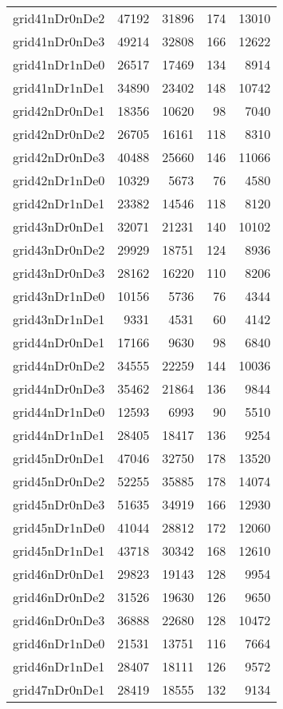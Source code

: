\begin{longtable}{lrrrr}
grid41nDr0nDe2 & 47192 & 31896 & 174 & 13010 \\
grid41nDr0nDe3 & 49214 & 32808 & 166 & 12622 \\
grid41nDr1nDe0 & 26517 & 17469 & 134 & 8914 \\
grid41nDr1nDe1 & 34890 & 23402 & 148 & 10742 \\
grid42nDr0nDe1 & 18356 & 10620 & 98 & 7040 \\
grid42nDr0nDe2 & 26705 & 16161 & 118 & 8310 \\
grid42nDr0nDe3 & 40488 & 25660 & 146 & 11066 \\
grid42nDr1nDe0 & 10329 & 5673 & 76 & 4580 \\
grid42nDr1nDe1 & 23382 & 14546 & 118 & 8120 \\
grid43nDr0nDe1 & 32071 & 21231 & 140 & 10102 \\
grid43nDr0nDe2 & 29929 & 18751 & 124 & 8936 \\
grid43nDr0nDe3 & 28162 & 16220 & 110 & 8206 \\
grid43nDr1nDe0 & 10156 & 5736 & 76 & 4344 \\
grid43nDr1nDe1 & 9331 & 4531 & 60 & 4142 \\
grid44nDr0nDe1 & 17166 & 9630 & 98 & 6840 \\
grid44nDr0nDe2 & 34555 & 22259 & 144 & 10036 \\
grid44nDr0nDe3 & 35462 & 21864 & 136 & 9844 \\
grid44nDr1nDe0 & 12593 & 6993 & 90 & 5510 \\
grid44nDr1nDe1 & 28405 & 18417 & 136 & 9254 \\
grid45nDr0nDe1 & 47046 & 32750 & 178 & 13520 \\
grid45nDr0nDe2 & 52255 & 35885 & 178 & 14074 \\
grid45nDr0nDe3 & 51635 & 34919 & 166 & 12930 \\
grid45nDr1nDe0 & 41044 & 28812 & 172 & 12060 \\
grid45nDr1nDe1 & 43718 & 30342 & 168 & 12610 \\
grid46nDr0nDe1 & 29823 & 19143 & 128 & 9954 \\
grid46nDr0nDe2 & 31526 & 19630 & 126 & 9650 \\
grid46nDr0nDe3 & 36888 & 22680 & 128 & 10472 \\
grid46nDr1nDe0 & 21531 & 13751 & 116 & 7664 \\
grid46nDr1nDe1 & 28407 & 18111 & 126 & 9572 \\
grid47nDr0nDe1 & 28419 & 18555 & 132 & 9134 \\

\end{longtable}
